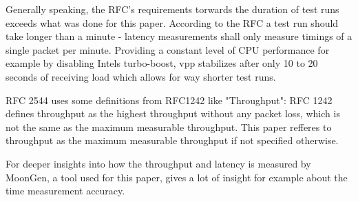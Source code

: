 Generally speaking, the RFC's requirements torwards the duration of
test runs exceeds what was done for this paper. According to the RFC a
test run should take longer than a minute - latency measurements shall
only measure timings of a single packet per minute. Providing a
constant level of CPU performance for example by disabling Intels
turbo-boost, \Ac{vpp} stabilizes after only 10 to 20 seconds of
receiving load which allows for way shorter test runs.



RFC 2544 uses some definitions from RFC1242 \cite{rfc1242} like
"Throughput": RFC 1242 defines throughput as the highest throughput
without any packet loss, which is not the same as the maximum
measurable throughput. This paper refferes to throughput as the
maximum measurable throughput if not specified otherwise.




For deeper insights into how the throughput and latency is measured by
MoonGen, a tool used for this paper, \cite{emmerich2015moongen}
gives a lot of insight for example about the time measurement
accuracy. 



